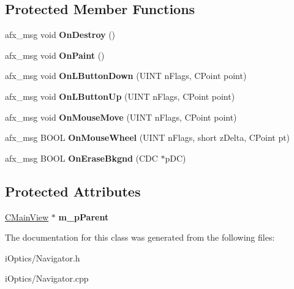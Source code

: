 \subsection*{Protected Member Functions}
\begin{DoxyCompactItemize}
\item 
\mbox{\label{class_navigator_abed125f064d55901ab7037d16414ff3d}} 
afx\+\_\+msg void {\bfseries On\+Destroy} ()
\item 
\mbox{\label{class_navigator_a03c00a5cff644d9130c79d2ac1c0a477}} 
afx\+\_\+msg void {\bfseries On\+Paint} ()
\item 
\mbox{\label{class_navigator_a06ef074cb12d849045cda801542f5324}} 
afx\+\_\+msg void {\bfseries On\+L\+Button\+Down} (U\+I\+NT n\+Flags, C\+Point point)
\item 
\mbox{\label{class_navigator_a928fb26ee69a9055abfaec5be4aafba2}} 
afx\+\_\+msg void {\bfseries On\+L\+Button\+Up} (U\+I\+NT n\+Flags, C\+Point point)
\item 
\mbox{\label{class_navigator_ac22c3de57fe917db53d9d39f1f73332a}} 
afx\+\_\+msg void {\bfseries On\+Mouse\+Move} (U\+I\+NT n\+Flags, C\+Point point)
\item 
\mbox{\label{class_navigator_a02c933f968cd19da2543e74950cfd3e4}} 
afx\+\_\+msg B\+O\+OL {\bfseries On\+Mouse\+Wheel} (U\+I\+NT n\+Flags, short z\+Delta, C\+Point pt)
\item 
\mbox{\label{class_navigator_a2f96fee841493e852cdeecc32889aa3a}} 
afx\+\_\+msg B\+O\+OL {\bfseries On\+Erase\+Bkgnd} (C\+DC $\ast$p\+DC)
\end{DoxyCompactItemize}
\subsection*{Protected Attributes}
\begin{DoxyCompactItemize}
\item 
\mbox{\label{class_navigator_aa042070b419a6b78a71107cc927494b2}} 
\mbox{\hyperlink{class_c_main_view}{C\+Main\+View}} $\ast$ {\bfseries m\+\_\+p\+Parent}
\end{DoxyCompactItemize}


The documentation for this class was generated from the following files\+:\begin{DoxyCompactItemize}
\item 
i\+Optics/Navigator.\+h\item 
i\+Optics/Navigator.\+cpp\end{DoxyCompactItemize}
